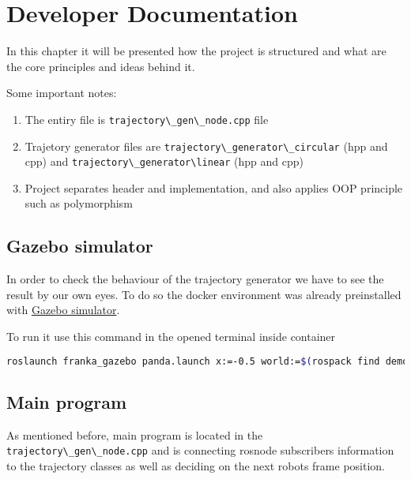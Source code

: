 \chapter{Developer Documentation}\label{chapter:developer}

In this chapter it will be presented how the project is structured and what are the core principles and ideas behind it.

Some important notes:
\begin{enumerate}
    \item The entiry file is \lstinline{trajectory\_gen\_node.cpp} file 
    \item  Trajetory generator files are \lstinline{trajectory\_generator\_circular} (hpp and cpp) and \lstinline{trajectory\_generator\linear} (hpp and cpp)
    \item Project separates header and implementation, and also applies OOP principle such as polymorphism
\end{enumerate}


\section{Gazebo simulator}
In order to check the behaviour of the trajectory generator we have to see the result by our own eyes. To do so the docker environment was already preinstalled with  \href{https://gazebosim.org/home}{Gazebo simulator}.

To run it use this command in the opened terminal inside container
\begin{lstlisting}[language=bash]
roslaunch franka_gazebo panda.launch x:=-0.5 world:=$(rospack find demo_pkg)/world/pick_place.sdf controller:=cartesian_impedance_example_controller     rviz:=false
\end{lstlisting}

\section{Main program}
As mentioned before, main program is located in the \lstinline{trajectory\_gen\_node.cpp} and is connecting rosnode subscribers information to the trajectory classes as well as deciding on the next robots frame position.

